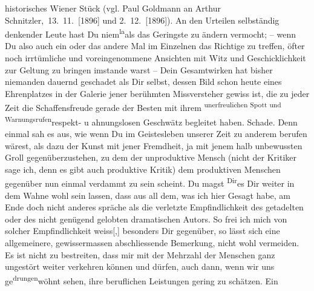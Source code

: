 \begin{ledgroupsized}[t]{13cm}
{{{                  historisches Wiener Stück (vgl. Paul Goldmann an Arthur Schnitzler, 13. 11. [1896] und 2. 12. [1896])}}}\label{K_L03521-13h}. An den
               Urteilen selbständig denkender Leute hast Du niem\substVorne{}\textsuperscript{la}\substDazwischen{}al\substHinten{}s das Geringste zu ändern vermocht; – wenn Du also auch ein oder das andere
               Mal im Einzelnen das Richtige zu treffen, öfter noch irrtümliche und voreingenommene
               Ansichten mit Witz und Geschicklichkeit zur Geltung zu bringen imstande warst \introOben{}–\introOben{} Dein Gesamtwirken hat bisher niemanden dauernd geschadet
               als Dir selbst, dessen Bild schon heute eines Ehrenplatzes in der Galerie jener
               berühmten Missversteher gewiss ist, die zu jeder Zeit die Schaffensfreude gerade der
               Besten mit ihrem \substVorne{}\textsuperscript{unerfreulichen Spott und Warnungsrufen}{\allowbreak}\substDazwischen{}respekt- u ahnungslosen Geschwätz\substHinten{} begleitet haben. Schade. Denn einmal sah es aus, wie wenn Du im Geistesleben
               unserer Zeit zu anderem berufen wärest, als \introOben{}dazu\introOben{} der Kunst
               mit jener Fremdheit, ja mit jenem halb unbewussten Groll gegenüberzustehen, zu dem
               der unproduktive Mensch (nicht der Kritiker sage ich, denn es gibt auch produktive
               Kritik) dem produktiven Menschen gegenüber nun einmal verdammt zu {\pb}sein scheint.\pend
           \pstart
           Du magst \substVorne{}\textsuperscript{Dir}\substDazwischen{}es\substHinten{} Dir weiter in dem Wahne wohl sein lassen, dass aus all dem, was ich hier
               Gesagt habe, am Ende doch nicht anderes spräche als die verletzte Empfindlichkeit des
               getadelten oder des \introOben{}nicht\introOben{} genügend gelobten dramatischen
               Autors. So frei ich mich von solcher Empfindlichkeit weiss{[},{]}{ }\label{T_L03521-15v}\label{T_L03521-15h} besonders Dir
               gegenüber, so lässt sich \label{T_L03521-21v}\label{T_L03521-21h}{ }\introOben{}eine allgemeinere,\introOben{} gewissermassen abschliessende Bemerkung,
               nicht wohl vermeiden. Es ist nicht zu bestreiten, dass mir mit der Mehrzahl der
               Menschen ganz ungestört weiter verkehren können und dürfen, auch dann, wenn wir uns ge\substVorne{}\textsuperscript{drungen}{\allowbreak}\substDazwischen{}wöhnt\substHinten{} sehen, ihre beruflichen Leistungen gering zu schätzen. Ein

\end{ledgroupsized}
